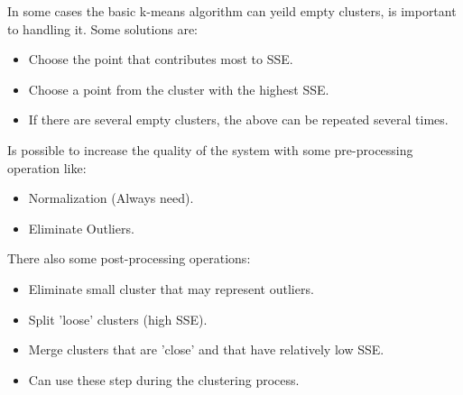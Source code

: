 \documentclass[12pt]{article}
\begin{document}
In some cases the basic k-means algorithm can yeild empty clusters, is important to handling it. Some solutions are:
\begin{itemize}
  \item Choose the point that contributes most to SSE.
  \item Choose a point from the cluster with the highest SSE.
  \item If there are several empty clusters, the above can be repeated several times.
\end{itemize}
Is possible to increase the quality of the system with some pre-processing operation like:
\begin{itemize}
  \item Normalization (Always need).
  \item Eliminate Outliers.
\end{itemize}
There also some post-processing operations:
\begin{itemize}
  \item Eliminate small cluster that may represent outliers.
  \item Split 'loose' clusters (high SSE).
  \item Merge clusters that are 'close' and that have relatively low SSE.
  \item Can use these step during the clustering process.
\end{itemize}
\end{document}
